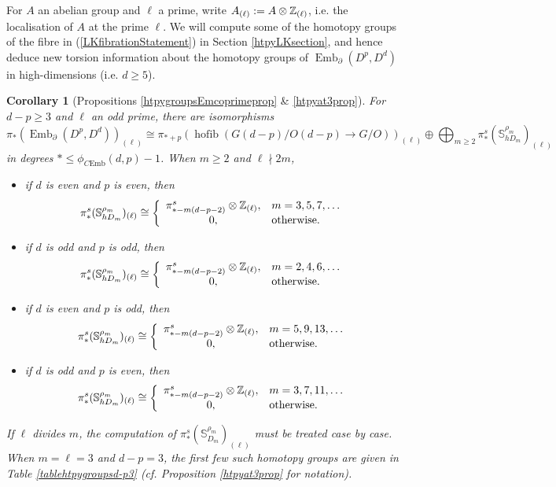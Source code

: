 \documentclass[a4paper, oneside]{amsart}
\newcommand{\emb}{\operatorname{Emb}}
\newcommand{\hofib}{\operatorname{hofib}}
\newcommand{\cemb}{C\mathrm{Emb}}
\newcommand{\1}{\mathds{1}}
\newtheorem{corx}[thmx]{Corollary}
\theoremstyle{remark}
\theoremstyle{definition}
\newcommand{\Z}{{\scaleobj{0.97}{\mathbb{Z}}}}
\newcommand{\s}{\mathbb{S}}
\numberwithin{equation}{section}
\begin{document}
For $A$ an abelian group and $\ell$ a prime, write $A_{(\ell)}:=A\otimes \Z_{(\ell)}$, i.e. the localisation of $A$ at the prime $\ell$. We will compute some of the homotopy groups of the fibre in (\ref{LKfibrationStatement}) in Section \ref{htpyLKsection}, and hence deduce new torsion information about the homotopy groups of $\emb_\partial(D^p,D^d)$ in high-dimensions (i.e. $d\geq 5$). 

\begin{corx}[Propositions \ref{htpygroupsEmcoprimeprop} \& \ref{htpyat3prop}] For $d-p\geq 3$ and $\ell$ an odd prime, there are isomorphisms
$$
\pi_*(\emb_\partial(D^p,D^d))_{(\ell)}\cong \pi_{*+p}(\hofib(G(d-p)/O(d-p)\to G/O))_{(\ell)}\oplus\bigoplus_{m\geq 2}\pi_*^s(\s^{\rho_m}_{hD_m})_{(\ell)}
$$
in degrees $*\leq \phi_{\cemb}(d,p)-1$. When $m\geq 2$ and $\ell\nmid 2m$,
    \begin{itemize}
    \item if $d$ is even and $p$ is even, then
    $$
\pi_*^s(\s^{\rho_m}_{hD_m})_{(\ell)}\cong\left\{
\begin{array}{cl}
    \pi_{*-m(d-p-2)}^s\otimes \Z_{(\ell)}, & m=3,5,7,\dots\\
    0, & \text{otherwise}.
\end{array}
\right.
    $$

    \item if $d$ is odd and $p$ is odd, then
    $$
\pi_*^s(\s^{\rho_m}_{hD_m})_{(\ell)}\cong\left\{
\begin{array}{cl}
    \pi_{*-m(d-p-2)}^s\otimes \Z_{(\ell)}, & m=2,4,6,\dots\\
    0, & \text{otherwise}.
\end{array}
\right.
    $$

    \item if $d$ is even and $p$ is odd, then
    $$
\pi_*^s(\s^{\rho_m}_{hD_m})_{(\ell)}\cong\left\{
\begin{array}{cl}
    \pi_{*-m(d-p-2)}^s\otimes \Z_{(\ell)}, & m=5,9,13,\dots\\
    0, & \text{otherwise}.
\end{array}
\right.
$$ 

    \item if $d$ is odd and $p$ is even, then
    $$
\pi_*^s(\s^{\rho_m}_{hD_m})_{(\ell)}\cong\left\{
\begin{array}{cl}
    \pi_{*-m(d-p-2)}^s\otimes \Z_{(\ell)}, & m=3,7,11,\dots\\
    0, & \text{otherwise}.
\end{array}
\right.
    $$
\end{itemize}
If $\ell$ divides $m$, the computation of $\pi_*^s(\s^{\rho_m}_{D_m})_{(\ell)}$ must be treated case by case. When $m=\ell=3$ and $d-p=3$, the first few such homotopy groups are given in Table \ref{tablehtpygroupsd-p3} (cf. Proposition \ref{htpyat3prop} for notation). 
\end{corx}
\end{document}
